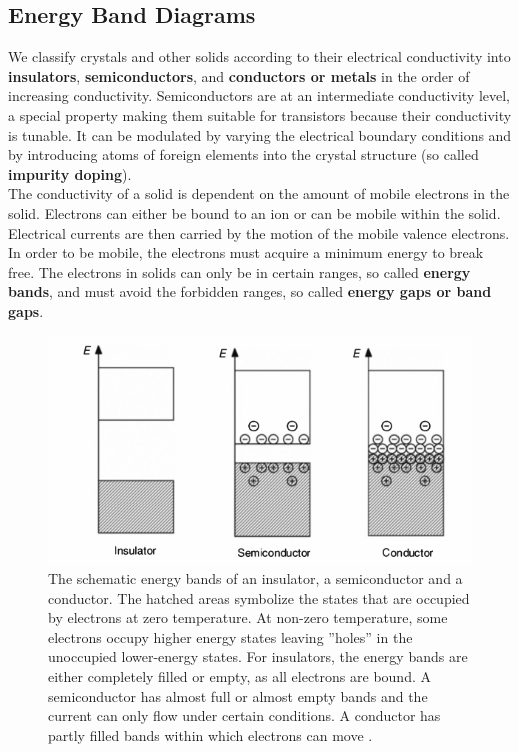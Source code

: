 \documentclass[main]{subfiles}
\begin{document}
\subsection{Energy Band Diagrams}
We classify crystals and other solids according to their electrical conductivity into \textbf{insulators}, \textbf{semiconductors}, and \textbf{conductors or metals} in the order of increasing conductivity. Semiconductors are at an intermediate conductivity level, a special property making them suitable for transistors because their conductivity is tunable. It can be modulated by varying the electrical boundary conditions and by introducing atoms of foreign elements into the crystal structure (so called \textbf{impurity doping}).\\
The conductivity of a solid is dependent on the amount of mobile electrons in the solid. Electrons can either be bound to an ion or can be mobile within the solid. Electrical currents are then carried by the motion of the mobile valence electrons. In order to be mobile, the electrons must acquire a minimum energy to break free. The electrons in solids can only be in certain ranges, so called \textbf{energy bands}, and must avoid the forbidden ranges, so called \textbf{energy gaps or band gaps}.

\begin{figure}[H]
\centering
\includegraphics[scale=0.5]{figs/energybands.png}
\caption{The schematic energy bands of an insulator, a semiconductor and a conductor. The hatched areas symbolize the states that are occupied by electrons at zero temperature. At non-zero temperature, some electrons occupy higher energy states leaving ''holes'' in the unoccupied lower-energy states. For insulators, the energy bands are either completely filled or empty, as all electrons are bound. A semiconductor has almost full or almost empty bands and the current can only flow under certain conditions. A conductor has partly filled bands within which electrons can move \cite{book:VLSI}.}
\end{figure}
\end{document}
